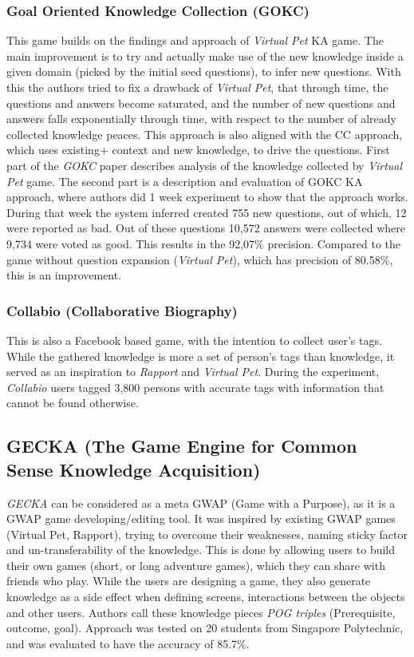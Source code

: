 \subsubsection{Goal Oriented Knowledge Collection (GOKC)}
\label{section:r:gokc}
This game builds on the
findings and approach of \emph{Virtual Pet} KA game. The main improvement
is to try and actually make use of the new knowledge inside a given domain
(picked by the initial seed questions), to infer new questions. With this
the authors tried to fix a drawback of \emph{Virtual Pet}, that through
time, the questions and answers become saturated, and the number of new
questions and answers falls exponentially through time, with respect
to the number of already collected knowledge peaces.
This approach is also aligned with the CC approach, which uses existing+
context and new knowledge, to drive the questions. First part of the \emph{GOKC}
paper describes analysis of the knowledge collected by \emph{Virtual Pet} game. 
The second part is a description and evaluation of  GOKC KA approach, where 
authors did 1 week experiment to show that the approach works. During that 
week the system inferred created 755 new questions, out of which, 12 were
reported as bad. Out of these questions 10,572 answers were collected where
9,734 were voted as good. This results in the 92,07\% precision. Compared
to the game without question expansion (\emph{Virtual Pet}), which has
precision of 80.58\%, this is an improvement.

\subsubsection{Collabio (Collaborative Biography)}
\label{section:r:collabio}
This is also a Facebook based game, with the intention to
collect user's tags. While the gathered knowledge is more a set of person's 
tags than knowledge, it served as an inspiration to \emph{Rapport} and 
\emph{Virtual Pet}. During the experiment, \emph{Collabio} users tagged
3,800 persons with accurate tags with information that cannot be found 
otherwise\parencite{Bernstein2009, Bernstein2010}.

\subsection{GECKA (The Game Engine for Common Sense Knowledge Acquisition)}
\label{section:r:gecka}
\emph{GECKA} can be considered as a meta GWAP (Game with a Purpose), as it is
a GWAP game developing/editing tool. It was inspired by existing GWAP games
(Virtual Pet, Rapport), trying to overcome their weaknesses, naming sticky 
factor and un-transferability of the knowledge. This is done by allowing
users to build their own games (short, or long adventure games), which they can
share with friends who play. While the users are designing a game, they
also generate knowledge as a side effect when defining screens, interactions
between the objects and other users. Authors call these knowledge pieces
\emph{POG triples} (Prerequisite, outcome, goal).
Approach was tested on 20 students from Singapore Polytechnic, and was evaluated
to have the accuracy of  85.7\%.

